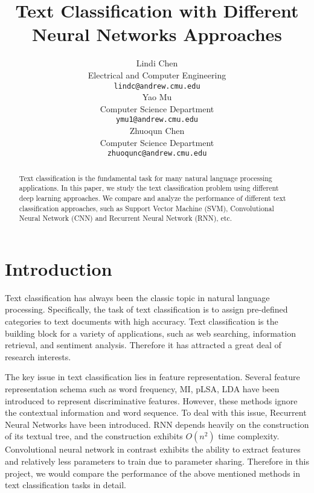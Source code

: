 \documentclass{article}
\title{Text Classification with Different Neural Networks Approaches}
\author{
  Lindi Chen \\
  Electrical and Computer Engineering\\
  \texttt{lindc@andrew.cmu.edu}\\
  \And
  Yao Mu \\
  Computer Science Department\\
  \texttt{ymu1@andrew.cmu.edu}\\
  \And
  Zhuoqun Chen\\
  Computer Science Department\\
  \texttt{zhuoqunc@andrew.cmu.edu} \\
}
\begin{document}

\maketitle

\begin{abstract}
Text classification is the fundamental task for many natural language processing applications. In this paper, we study the text classification problem using different deep learning approaches.  We compare and analyze the performance of different text classification approaches, such as Support Vector Machine (SVM), Convolutional Neural Network (CNN) and Recurrent Neural Network (RNN), etc.
\end{abstract}



\section{Introduction}
Text classification has always been the classic topic in natural language processing. Specifically, the task of text classification is to assign pre-defined categories to text documents with high accuracy. Text classification is the building block for a variety of applications, such as web searching, information retrieval, and sentiment analysis. Therefore it has attracted a great deal of research interests.


The key issue in text classification lies in feature representation. Several feature representation schema such as word frequency, MI, pLSA, LDA have been introduced to represent discriminative features. However, these methods ignore the contextual information and word sequence. To deal with this issue, Recurrent Neural Networks have been introduced. RNN depends heavily on the construction of its textual tree, and the construction exhibits $O(n^2)$ time complexity. Convolutional neural network in contrast exhibits the ability to extract features and relatively less parameters to train due to parameter sharing. Therefore in this project, we would compare the performance of the above mentioned methods in text classification tasks in detail.
\end{document}
